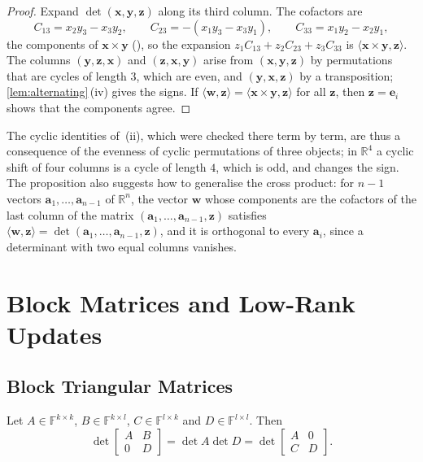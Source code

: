 \begin{proof}
Expand $\det(\mathbf x,\mathbf y,\mathbf z)$ along its third column. The cofactors are
\[
C_{13}=x_2y_3-x_3y_2,\qquad C_{23}=-(x_1y_3-x_3y_1),\qquad C_{33}=x_1y_2-x_2y_1,
\]
the components of $\mathbf x\times\mathbf y$ (), so the expansion $z_1C_{13}+z_2C_{23}+z_3C_{33}$ is $\langle\mathbf x\times\mathbf y,\mathbf z\rangle$. The columns $(\mathbf y,\mathbf z,\mathbf x)$ and $(\mathbf z,\mathbf x,\mathbf y)$ arise from $(\mathbf x,\mathbf y,\mathbf z)$ by permutations that are cycles of length $3$, which are even, and $(\mathbf y,\mathbf x,\mathbf z)$ by a transposition; \cref{lem:alternating}\,(iv) gives the signs. If $\langle\mathbf w,\mathbf z\rangle=\langle\mathbf x\times\mathbf y,\mathbf z\rangle$ for all $\mathbf z$, then $\mathbf z=\mathbf e_i$ shows that the components agree.
\end{proof}

The cyclic identities of \,(ii), which were checked there term by term, are thus a consequence of the evenness of cyclic permutations of three objects; in $\mathbb R^4$ a cyclic shift of four columns is a cycle of length $4$, which is odd, and changes the sign. The proposition also suggests how to generalise the cross product: for $n-1$ vectors $\mathbf a_1,\ldots,\mathbf a_{n-1}$ of $\mathbb R^n$, the vector $\mathbf w$ whose components are the cofactors of the last column of the matrix $(\mathbf a_1,\ldots,\mathbf a_{n-1},\mathbf z)$ satisfies $\langle\mathbf w,\mathbf z\rangle=\det(\mathbf a_1,\ldots,\mathbf a_{n-1},\mathbf z)$, and it is orthogonal to every $\mathbf a_i$, since a determinant with two equal columns vanishes.

\section{Block Matrices and Low-Rank Updates}
\label{sec:det-block}

\subsection{Block Triangular Matrices}

\begin{theorem}
\label{thm:det-block-triangular}
Let $A\in\mathbb F^{k\times k}$, $B\in\mathbb F^{k\times l}$, $C\in\mathbb F^{l\times k}$ and $D\in\mathbb F^{l\times l}$. Then
\[
\det\begin{bmatrix}A&B\\0&D\end{bmatrix}=\det A\det D=\det\begin{bmatrix}A&0\\C&D\end{bmatrix}.
\]
\end{theorem}

